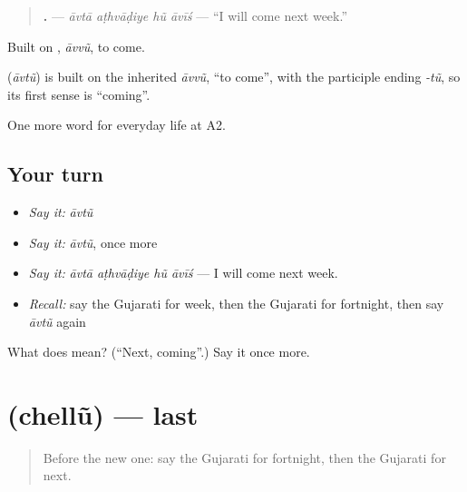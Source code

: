 \begin{quote}
\textbf{   .} — \emph{āvtā aṭhvāḍiye hũ āvīś} — \textquotedblleft{}I will come next week.\textquotedblright{}
\end{quote}

Built on \textbf{}, \emph{āvvũ}, to come.

\begin{cousinweb}
\textbf{} (\emph{āvtũ}) is built on the inherited \emph{āvvũ}, \textquotedblleft{}to come\textquotedblright{}, with the participle ending \emph{-tũ}, so its first sense is \textquotedblleft{}coming\textquotedblright{}.
\end{cousinweb}

\begin{grammarlens}[title={What you've built}]
One more word for everyday life at A2.
\end{grammarlens}

\subsection*{Your turn}
\begin{itemize}
\raggedright
  \item \emph{Say it:} \emph{āvtũ}
  \item \emph{Say it:} \emph{āvtũ}, once more
  \item \emph{Say it:} \emph{āvtā aṭhvāḍiye hũ āvīś} — I will come next week.
  \item \emph{Recall:} say the Gujarati for week, then the Gujarati for fortnight, then say \emph{āvtũ} again
\end{itemize}

\begin{tcolorbox}[breakable,colback=teal!4,colframe=teal!35!black,title={Before you move on}]
What does  mean? (\textquotedblleft{}Next, coming\textquotedblright{}.) Say it once more.
\end{tcolorbox}
\section[\texorpdfstring{\gu{છેલ્લું} (chellũ)}{છેલ્લું (chellũ)}]{ (chellũ) — last}

\label{lesson:GU-C173-chellu}



\begin{quote}
Before the new one: say the Gujarati for fortnight, then the Gujarati for next.
\end{quote}

